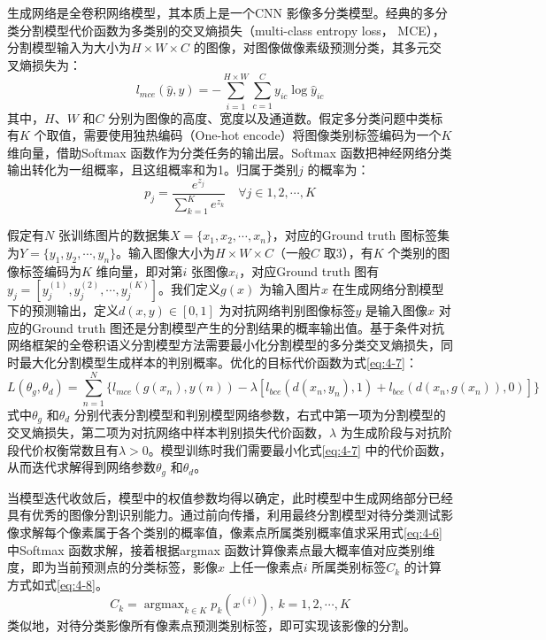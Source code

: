 生成网络是全卷积网络模型，其本质上是一个CNN 影像多分类模型。经典的多分类分割模型代价函数为多类别的交叉熵损失（multi-class entropy loss， MCE），分割模型输入为大小为$H\times W\times C$ 的图像，对图像做像素级预测分类，其多元交叉熵损失为：
\begin{equation}
  \label{eq:4-5}
  l_{mce} (\hat{y}, y) = -\sum_{i=1}^{H\times W}\sum_{c=1}^{C}y_{ic}\log\hat{y}_{ic}
\end{equation}
其中，$H$、$W$ 和$C$ 分别为图像的高度、宽度以及通道数。假定多分类问题中类标有$K$ 个取值，需要使用独热编码（One-hot encode）将图像类别标签编码为一个$K$ 维向量，借助Softmax 函数作为分类任务的输出层。Softmax 函数把神经网络分类输出转化为一组概率，且这组概率和为1。归属于类别$j$ 的概率为：
\begin{equation}
  \label{eq:4-6}
  p_j = \frac{e^{z_j}}{\sum_{k=1}^Ke^{z_k}}  \quad \forall j \in 1,2,\cdots, K
\end{equation}

假定有$N$ 张训练图片的数据集$X = \{x_1,x_2,\cdots, x_n \}$，对应的Ground truth 图标签集为$Y = \{y_1,y_2,\cdots, y_n \}$。输入图像大小为$H\times W\times C$（一般$C$ 取$3$），有$K$ 个类别的图像标签编码为$K$  维向量，即对第$i$ 张图像$x_i$，对应Ground truth 图有$y_j = [y_j^{(1)},y_j^{(2)}, \cdots, y_j^{(K)}]$。我们定义$g(x)$ 为输入图片$x$ 在生成网络分割模型下的预测输出，定义$d(x,y)\in [0,1]$ 为对抗网络判别图像标签$y$ 是输入图像$x$ 对应的Ground truth 图还是分割模型产生的分割结果的概率输出值。基于条件对抗网络框架的全卷积语义分割模型方法需要最小化分割模型的多分类交叉熵损失，同时最大化分割模型生成样本的判别概率。优化的目标代价函数为式\ref{eq:4-7}：
\begin{equation}
  \label{eq:4-7}
  L(\theta_g,\theta_d) = \sum_{n=1}^N \lbrace l_{mce} (g(x_n),y(n)) - \lambda [l_{bce} (d(x_n,y_n),1) + l_{bce}(d(x_n,g(x_n)),0)] \rbrace
\end{equation}
式中$\theta_g$ 和$\theta_d$ 分别代表分割模型和判别模型网络参数，右式中第一项为分割模型的交叉熵损失，第二项为对抗网络中样本判别损失代价函数，$\lambda$ 为生成阶段与对抗阶段代价权衡常数且有$\lambda > 0$。模型训练时我们需要最小化式\ref{eq:4-7} 中的代价函数，从而迭代求解得到网络参数$\theta_g$ 和$\theta_d$。

当模型迭代收敛后，模型中的权值参数均得以确定，此时模型中生成网络部分已经具有优秀的图像分割识别能力。通过前向传播，利用最终分割模型对待分类测试影像求解每个像素属于各个类别的概率值，像素点所属类别概率值求采用式\ref{eq:4-6} 中Softmax 函数求解，接着根据argmax 函数计算像素点最大概率值对应类别维度，即为当前预测点的分类标签，影像$x$ 上任一像素点$i$ 所属类别标签$C_k$ 的计算方式如式\ref{eq:4-8}。
\begin{equation}
  \label{eq:4-8}
  C_k = \mathop{\arg\max}_{k \in K} p_k(x^{(i)}), \ k=1,2,\cdots,K
\end{equation}
类似地，对待分类影像所有像素点预测类别标签，即可实现该影像的分割。

